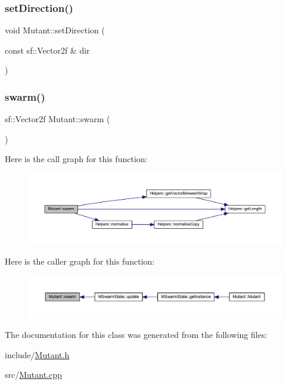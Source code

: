 \subsubsection{\texorpdfstring{set\+Direction()}{setDirection()}}
{\footnotesize\ttfamily void Mutant\+::set\+Direction (\begin{DoxyParamCaption}\item[{const sf\+::\+Vector2f \&}]{dir }\end{DoxyParamCaption})}

\mbox{\label{class_mutant_a03a015517d346506a2d994e3867b6228}} 
\subsubsection{\texorpdfstring{swarm()}{swarm()}}
{\footnotesize\ttfamily sf\+::\+Vector2f Mutant\+::swarm (\begin{DoxyParamCaption}{ }\end{DoxyParamCaption})}

Here is the call graph for this function\+:
\nopagebreak
\begin{figure}[H]
\begin{center}
\leavevmode
\includegraphics[width=350pt]{class_mutant_a03a015517d346506a2d994e3867b6228_cgraph}
\end{center}
\end{figure}
Here is the caller graph for this function\+:
\nopagebreak
\begin{figure}[H]
\begin{center}
\leavevmode
\includegraphics[width=350pt]{class_mutant_a03a015517d346506a2d994e3867b6228_icgraph}
\end{center}
\end{figure}


The documentation for this class was generated from the following files\+:\begin{DoxyCompactItemize}
\item 
include/\hyperlink{_mutant_8h}{Mutant.\+h}\item 
src/\hyperlink{_mutant_8cpp}{Mutant.\+cpp}\end{DoxyCompactItemize}

